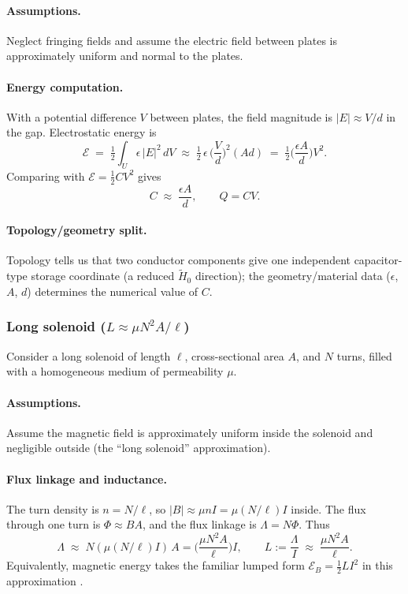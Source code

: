 \documentclass[11pt]{article}
\begin{document}
\paragraph{Assumptions.}
Neglect fringing fields and assume the electric field between plates is approximately uniform and normal to the plates.

\paragraph{Energy computation.}
With a potential difference $V$ between plates, the field magnitude is $|E|\approx V/d$ in the gap.
Electrostatic energy is
\[
\mathcal{E}\;=\;\tfrac12\int_U \epsilon\,|E|^2\,dV
\;\approx\;
\tfrac12\,\epsilon\,\Big(\frac{V}{d}\Big)^2 (A d)
\;=\;\tfrac12\Big(\frac{\epsilon A}{d}\Big)V^2.
\]
Comparing with $\mathcal{E}=\tfrac12 C V^2$ gives
\[
C\;\approx\;\frac{\epsilon A}{d},
\qquad
Q=CV.
\]

\paragraph{Topology/geometry split.}
Topology tells us that two conductor components give one independent capacitor-type storage coordinate (a reduced $\widetilde H_0$ direction); the geometry/material data ($\epsilon$, $A$, $d$) determines the numerical value of $C$.

\subsubsection{Long solenoid (\texorpdfstring{$L\approx \mu N^2A/\ell$}{L approx mu N squared A / ell})}
Consider a long solenoid of length $\ell$, cross-sectional area $A$, and $N$ turns, filled with a homogeneous medium of permeability $\mu$.

\paragraph{Assumptions.}
Assume the magnetic field is approximately uniform inside the solenoid and negligible outside (the ``long solenoid'' approximation).

\paragraph{Flux linkage and inductance.}
The turn density is $n=N/\ell$, so $|B|\approx \mu n I = \mu (N/\ell)I$ inside.
The flux through one turn is $\Phi\approx BA$, and the flux linkage is $\Lambda=N\Phi$.
Thus
\[
\Lambda\;\approx\;N(\mu (N/\ell)I)\,A=\Big(\frac{\mu N^2 A}{\ell}\Big)I,
\qquad
L:=\frac{\Lambda}{I}\;\approx\;\frac{\mu N^2 A}{\ell}.
\]
Equivalently, magnetic energy takes the familiar lumped form $\mathcal{E}_B=\tfrac12 L I^2$ in this approximation \cite{jackson_em_1998}.
\end{document}
